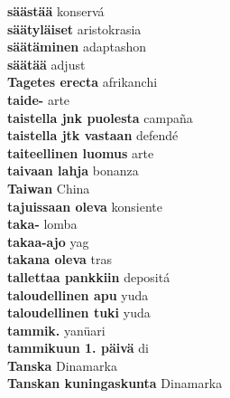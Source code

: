\textbf{ säästää  } konservá \\
\textbf{ säätyläiset  } aristokrasia \\
\textbf{ säätäminen  } adaptashon \\
\textbf{ säätää  } adjust \\
\textbf{ Tagetes erecta  } afrikanchi \\
\textbf{ taide-  } arte \\
\textbf{ taistella jnk puolesta  } campaña \\
\textbf{ taistella jtk vastaan  } defendé \\
\textbf{ taiteellinen luomus  } arte \\
\textbf{ taivaan lahja  } bonanza \\
\textbf{ Taiwan  } China \\
\textbf{ tajuissaan oleva  } konsiente \\
\textbf{ taka-  } lomba \\
\textbf{ takaa-ajo  } yag \\
\textbf{ takana oleva  } tras \\
\textbf{ tallettaa pankkiin  } depositá \\
\textbf{ taloudellinen apu  } yuda \\
\textbf{ taloudellinen tuki  } yuda \\
\textbf{ tammik.  } yanüari \\
\textbf{ tammikuun  1. päivä  } di \\
\textbf{ Tanska  } Dinamarka \\
\textbf{ Tanskan kuningaskunta  } Dinamarka \\
